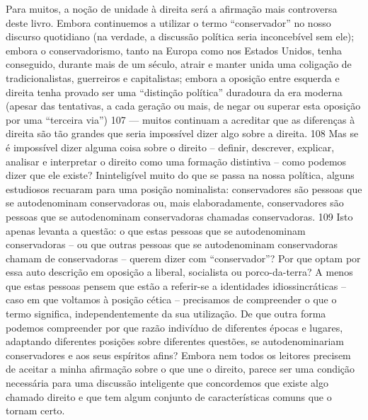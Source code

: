 Para muitos, a noção de unidade à direita será a afirmação mais controversa deste livro. Embora continuemos a utilizar o termo “conservador” no nosso discurso quotidiano (na verdade, a discussão política seria inconcebível sem ele); embora o conservadorismo, tanto na Europa como nos Estados Unidos, tenha conseguido, durante mais de um século, atrair e manter unida uma coligação de tradicionalistas, guerreiros e capitalistas; embora a oposição entre esquerda e direita tenha provado ser uma “distinção política” duradoura da era moderna (apesar das tentativas, a cada geração ou mais, de negar ou superar esta oposição por uma “terceira via”)
 {\color{blue} 107}  
— muitos continuam a acreditar que as diferenças à direita são tão grandes que seria impossível dizer algo sobre a direita.
 {\color{blue} 108}  
Mas se é impossível dizer alguma coisa sobre o direito – definir, descrever, explicar, analisar e interpretar o direito como uma formação distintiva – como podemos dizer que ele existe? Ininteligível muito do que se passa na nossa política, alguns estudiosos recuaram para uma posição nominalista: conservadores são pessoas que se autodenominam conservadoras ou, mais elaboradamente, conservadores são pessoas que se autodenominam conservadoras chamadas conservadoras.
 {\color{blue} 109}  
Isto apenas levanta a questão: o que estas pessoas que se autodenominam conservadoras – ou que outras pessoas que se autodenominam conservadoras chamam de conservadoras – querem dizer com “conservador”? Por que optam por essa auto descrição em oposição a liberal, socialista ou porco-da-terra? A menos que estas pessoas pensem que estão a referir-se a identidades idiossincráticas – caso em que voltamos à posição cética – precisamos de compreender o que o termo significa, independentemente da sua utilização. De que outra forma podemos compreender por que razão indivíduo de diferentes épocas e lugares, adaptando diferentes posições sobre diferentes questões, se autodenominariam conservadores e aos seus espíritos afins? Embora nem todos os leitores precisem de aceitar a minha afirmação sobre o que une o direito, parece ser uma condição necessária para uma discussão inteligente que concordemos que existe algo chamado direito e que tem algum conjunto de características comuns que o tornam certo.
 
\par
 
